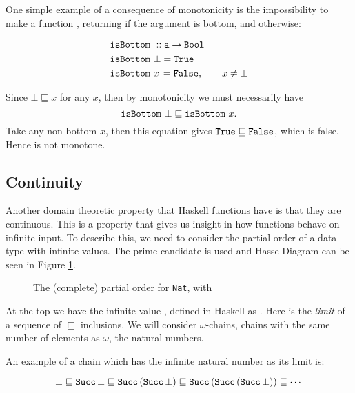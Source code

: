 One simple example of a consequence of monotonicity is the
impossibility to make a function , returning
 if the argument is bottom, and  otherwise:

\begin{align*}
& \texttt{isBottom} \,\, :: \texttt{a} \rightarrow \texttt{Bool} \\
& \texttt{isBottom} \,\, \bot = \texttt{True} \\
& \texttt{isBottom} \,\, x \, = \texttt{False}, \qquad x \neq \bot
\end{align*}

\noindent
Since $\bot \sqsubseteq x$ for any $x$, then by monotonicity we must
necessarily have
$$\texttt{isBottom} \,\, \bot \sqsubseteq \texttt{isBottom} \,\, x.$$
Take any non-bottom $x$, then this equation gives
$\texttt{True} \sqsubseteq \texttt{False}$, which is false. Hence
 is not monotone.

\subsection{Continuity}
Another domain theoretic property that Haskell functions have is that
they are continuous. This is a property that gives us insight in how
functions behave on infinite input.  To describe this, we need to
consider the partial order of a data type with infinite values. The
prime candidate  is used and Hasse
Diagram can be seen in Figure \ref{fig:natcpo}.

\begin{figure}[h]
\centering

\caption{
    The (complete) partial order for \texttt{Nat}, with 
    \label{fig:natcpo}
}
\end{figure}

At the top we have the infinite value , defined in Haskell as
. Here  is the \emph{limit} of a sequence
of $\sqsubseteq$ inclusions. We will consider $\omega$-chains, chains with the same number of elements as
$\omega$, the natural numbers.

\newpage

An example of a chain which has the infinite natural number 
as its limit is:

\begin{equation*}
\bot \sqsubseteq
\texttt{Succ} \, \bot \sqsubseteq
\texttt{Succ} \, (\texttt{Succ} \, \bot) \sqsubseteq
\texttt{Succ} \, (\texttt{Succ} \, (\texttt{Succ} \, \bot)) \sqsubseteq
\cdots
\end{equation*}

